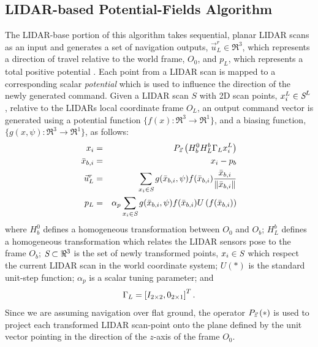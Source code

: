 		\subsection{LIDAR-based Potential-Fields Algorithm}
			The LIDAR-base portion of this algorithm takes sequential, planar LIDAR scans as an input and generates a set of navigation outputs, $\vec{u}^{r}_{L} \in \Re^{3}$, which represents a direction of travel relative to the world frame, $O_{0}$, and $p_{L}$, which represents a total positive potential . Each point from a LIDAR scan is mapped to a corresponding scalar \emph{potential} which is used to influence the direction of the newly generated command. Given a LIDAR scan $S$ with 2D scan points, $x_{i}^{L}\in\emph{S}^{L}$, relative to the LIDARs local coordinate frame $O_{L}$, an output command vector is generated using a potential function $\{ f(x) : \Re^{3}\rightarrow \Re^{1} \}$, and a biasing function, $\{ g(x,\psi) : \Re^{3}\rightarrow \Re^{1} \}$, as follows:
				\begin{eqnarray}
				x_{i}  &=& P_{ \vec{z} } \left( H_{b}^{0} H_{L}^{b} \Gamma_{L} x_{i}^{L} \right) \nonumber\\
				\bar{x}_{b,i} &=&  x_{i}-p_{b} \nonumber \\
				\vec{u}^{r}_{L} &=&  { \sum_{x_{i} \in \emph{S}} g( \bar{x}_{b,i},\psi)  f( \bar{x}_{b,i} ) \frac{\bar{x}_{b,i}}{\left\lVert\bar{x}_{b,i}\right\rVert} } \nonumber \\
				p_{L} & = & \alpha_{p}\sum_{x_{i} \in \emph{S}} g( \bar{x}_{b,i},\psi)  f( \bar{x}_{b,i} ) U\left(f( \bar{x}_{b,i} )\right)
				\end{eqnarray}
			where $H_{b}^{0}$ defines a homogeneous transformation between $O_{0}$ and $O_{b}$; $H_{L}^{b}$ defines a homogeneous transformation which relates the LIDAR sensors pose to the frame $O_{b}$; $\emph{S}\subset \Re^{3}$ is the set of newly transformed points, $x_{i} \in \emph{S}$ which respect the current LIDAR scan in the world coordinate system; $U(*)$ is the standard unit-step function;  $\alpha_{p}$ is a scalar tuning parameter; and 
				\begin{equation*}
					\Gamma_{L} = \left[ I_{2\times2}, 0_{2\times1} \right]^{T}.
				\end{equation*}
			Since we are assuming navigation over flat ground, the operator $P_{ \vec{z} }\left(*\right)$ is used to project each transformed LIDAR scan-point onto the plane defined by the unit vector pointing in the direction of the $z$-axis of the frame $O_{0}$.


